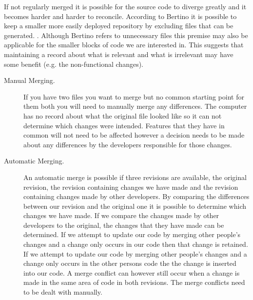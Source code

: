 If not regularly merged it is possible for the source code to diverge greatly and it becomes harder and harder to reconcile.
 According to Bertino it is possible to keep a smaller more easily deployed repository by excluding files that can be generated. \cite{Bertino2012}. Although Bertino refers to unnecessary files this premise may also be applicable for the smaller blocks of code we are interested in. This suggests that maintaining a record about what is relevant and what is irrelevant may have some benefit (e.g. the non-functional changes).
 
\begin{description}
  \item [Manual Merging.]
If you have two files you want to merge but no common starting point for them both you will need to manually merge any differences.
The computer has no record about what the original file looked like so it can not determine which changes were intended.
Features that they have in common will not need to be affected however a decision needs to be made about any differences by the developers responsible for those changes.

  \item [Automatic Merging.] 
An automatic merge is possible if three revisions are available, the original revision, the revision containing changes we have made and the revision containing changes made by other developers. 
By comparing the differences between our revision and the original one it is possible to determine which changes we have made.  
If we compare the changes made by other developers to the original, the changes that they have made can be determined.  
If we attempt to update our code by merging other people's changes and a change only occurs in our code then that change is retained. 
If we attempt to update our code by merging other people's changes and a change only occurs in the other persons code the the change is inserted into our code.
A merge conflict can however still occur when a change is made in the same area of code in both revisions.
The merge conflicts need to be dealt with manually.


% 
\end{description}
 
